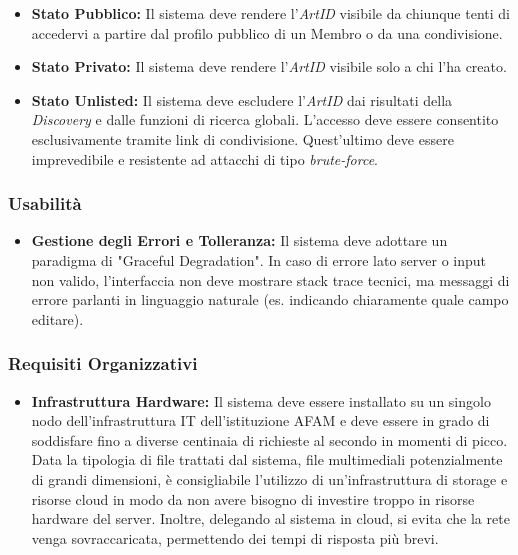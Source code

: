 \begin{itemize}
\begin{itemize}
    \item \textbf{Stato Pubblico:} Il sistema deve rendere l'\textit{ArtID} visibile da chiunque tenti di accedervi a partire dal profilo pubblico di un Membro o da una condivisione.
    \item \textbf{Stato Privato:} Il sistema deve rendere l'\textit{ArtID} visibile solo a chi l'ha creato.
    \item \textbf{Stato Unlisted:} Il sistema deve escludere l'\textit{ArtID} dai risultati della \textit{Discovery} e dalle funzioni di ricerca globali. L'accesso deve essere consentito esclusivamente tramite link di condivisione. Quest'ultimo deve essere imprevedibile e resistente ad attacchi di tipo \textit{brute-force}.
\end{itemize}
\end{itemize}

\subsubsection{Usabilità}
\begin{itemize}
    \item \textbf{Gestione degli Errori e Tolleranza:} Il sistema deve adottare un paradigma di "Graceful Degradation". In caso di errore lato server o input non valido, l'interfaccia non deve mostrare stack trace tecnici, ma messaggi di errore parlanti in linguaggio naturale (es. indicando chiaramente quale campo editare). 
\end{itemize}

\subsubsection{Requisiti Organizzativi}
\begin{itemize}
    \item \textbf{Infrastruttura Hardware:} Il sistema deve essere installato su un singolo nodo dell'infrastruttura IT dell'istituzione AFAM e deve essere in grado di soddisfare fino a diverse centinaia di richieste al secondo in momenti di picco.\\ Data la tipologia di file trattati dal sistema, file multimediali potenzialmente di grandi dimensioni, \`e consigliabile l'utilizzo di un'infrastruttura di storage e risorse cloud in modo da non avere bisogno di investire troppo in risorse hardware del server. Inoltre, delegando al sistema in cloud, si evita che la rete venga sovraccaricata, permettendo dei tempi di risposta pi\`u brevi.
\end{itemize}

